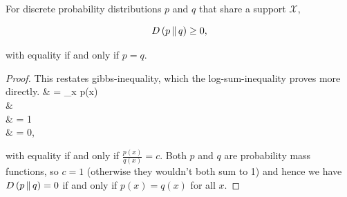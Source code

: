 \documentclass{article}
\begin{document}
\begin{theorem}
	For discrete probability distributions $p$ and $q$ that share a support $\mathcal{X},$

	\[ D\left( p \,\middle\|\, q \right) \geq 0, \]

	with equality if and only if $p = q.$
\end{theorem}
\begin{proof}
	This restates \@{gibbs-inequality}, which the \@{log-sum-inequality} proves more directly.
	\bal
	 & = \sum_{x \in {}} p(x)  \\
		  & \geq {}  \\
		  & = 1  \\
		  & = 0,
	\eal

	with equality if and only if $\frac{p(x)}{q(x)} = c.$ Both $p$ and $q$ are \@{probability mass functions}, so $c = 1$ (otherwise they wouldn't both sum to 1) and hence we have $D\left( p \,\middle\|\, q \right) = 0$ if and only if $p(x) = q(x)$ for all $x.$

\end{proof}
\end{document}

